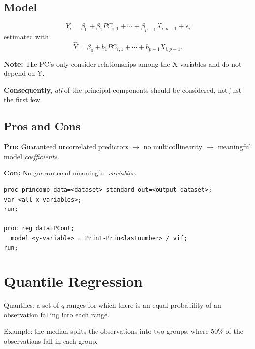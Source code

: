 \documentclass[12pt]{notes}
\begin{document}
\subsection{Model}
$$Y_i = \beta_0 + \beta_1PC_{i, 1} + \cdots + \beta_{p-1}X_{i, p-1} + \epsilon_i$$
estimated with 
$$\hat{Y}= \beta_0 + b_1PC_{i, 1} + \cdots + b_{p-1}X_{i, p-1}.$$

\textbf{Note:} The PC's only consider relationships among the X variables and do not depend on Y. 

\nspace
\textbf{Consequently,} \textit{all} of the principal components should be considered, not just the first few. 


\begin{minipage}[l][2cm][c]{\textwidth}
\end{minipage}

\subsection{Pros and Cons}
\bi
\item \textbf{Pro:} Guaranteed uncorrelated predictors $\rightarrow$ no multicollinearity $\rightarrow$ meaningful model \textit{coefficients}. 
\item \textbf{Con:} No guarantee of meaningful \textit{variables.}
\ei

\begin{verbatim}
proc princomp data=<dataset> standard out=<output dataset>;
var <all x variables>;
run;

proc reg data=PCout;
  model <y-variable> = Prin1-Prin<lastnumber> / vif;
run;
\end{verbatim}

\section{Quantile Regression}
Quantiles: a set of $q$ ranges for which there is an equal probability of an observation falling into each range. 
\bi
\item Example: the median splits the observations into two groups, where 50\% of the observations fall in each group. 
\ei
\end{document}
